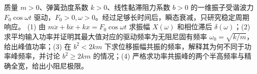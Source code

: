 质量 \(m>0\)、弹簧劲度系数 \(k>0\)、线性黏滞阻力系数 \(b>0\) 的一维振子受谐波力 \(F_0\cos\omega t\) 驱动，\(F_0>0,\omega>0\)。经过足够长时间后，瞬态衰减，只研究稳定周期响应。
(1) 由 \(m\ddot x+b\dot x+kx=F_0\cos\omega t\) 求振幅 \(X(\omega)\) 和相位滞后 \(\delta(\omega)\)；(2) 求平均输入功率并证明其最大值对应的驱动频率为无阻尼固有频率 \(\omega_0=\sqrt{k/m}\)，给出峰值功率；(3) 在 \(b^2<2km\) 下求位移振幅共振的频率，解释其为何不同于功率峰频率，并讨论 \(b^2\ge2km\) 的情况；(4) 严格求功率共振峰的两个半高频率与精确全宽，给出小阻尼极限。
